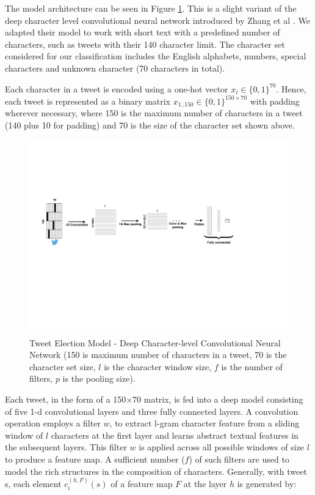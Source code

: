 \documentclass[letterpaper]{article}
\begin{document}
The model architecture can be seen in Figure \ref{cnn_elect}. This is a slight variant of the deep character level convolutional neural network introduced by Zhang et al \cite{zhang2015text}. We adapted their model to work with short text with a predefined number of characters, such as tweets with their 140 character limit. The character set considered for our classification includes the English alphabets, numbers, special characters and unknown character (70 characters in total). %


Each character in a tweet is encoded using a one-hot vector $x_i\in\{0,1\}^{70}$. Hence, each tweet is represented as a binary matrix $x_{1..150}\in\{0,1\}^{150\times70}$ with padding wherever necessary, where 150 is the maximum number of characters in a tweet (140 plus 10 for padding) and 70 is the size of the character set shown above. 
\begin{figure}[]
\includegraphics[width=\columnwidth]{cnn_char.pdf} %
\caption{Tweet Election Model -  Deep Character-level Convolutional Neural Network (150 is maximum number of characters in a tweet, 70 is the character set size, $l$ is the character window size,  $f$ is the number of filters, $p$ is the pooling size).}
\label{cnn_elect}
\end{figure}
Each tweet, in the form of a 150$\times$70 matrix, is fed into a deep model consisting of five 1-d convolutional layers and three fully connected layers. A convolution operation employs a filter $w$, to extract l-gram character feature from a sliding window of $l$ characters at the first layer and learns abstract textual features in the subsequent layers. This filter $w$ is applied across all possible windows of size $l$ to produce a feature map. A sufficient number ($f$) of such filters are used to model the rich structures in the composition of characters. Generally, with tweet s, each element $c_i^{(h,F)}(s)$ of a feature map $F$ at the layer $h$ is generated by:
\end{document}

